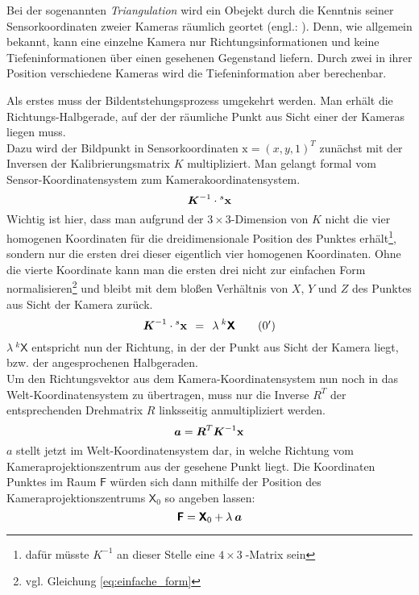 Bei der sogenannten \emph{Triangulation} wird ein Obejekt durch die Kenntnis seiner Sensorkoordinaten zweier Kameras räumlich geortet (engl.: ). Denn, wie allgemein bekannt, kann eine einzelne Kamera nur Richtungsinformationen und keine Tiefeninformationen über einen gesehenen Gegenstand liefern. Durch zwei in ihrer Position verschiedene Kameras wird die Tiefeninformation aber berechenbar.\kleinerabstand

Als erstes muss der Bildentstehungsprozess umgekehrt werden. Man erhält die Richtungs-Halbgerade, auf der der räumliche Punkt aus Sicht einer der Kameras liegen muss.\\
Dazu wird der Bildpunkt in Sensorkoordinaten $\mathrm{x}=(x,y,1)^T$ zunächst mit der Inversen der Kalibrierungsmatrix $K$ multipliziert. Man gelangt formal vom Sensor-Koordinatensystem zum Kamerakoordinatensystem.
\begin{equation}
	\boldsymbol{K}^{-1}\cdot {^s\boldsymbol{\mathrm{x}}}
\end{equation}
Wichtig ist hier, dass man aufgrund der $3{\times}3$-Dimension von $K$ nicht die vier homogenen Koordinaten für die dreidimensionale Position des Punktes erhält\footnote{dafür müsste $K^{-1}$ an dieser Stelle eine $4{\times}3\;$-Matrix sein}, sondern nur die ersten drei dieser eigentlich vier homogenen Koordinaten. Ohne die vierte Koordinate kann man die ersten drei nicht zur einfachen Form normalisieren\footnote{vgl. Gleichung \ref{eq:einfache_form}} und bleibt mit dem bloßen Verhältnis von $X$, $Y$ und $Z$ des Punktes aus Sicht der Kamera zurück.
\begin{equation*}
	\boldsymbol{K}^{-1}\cdot{^s\boldsymbol{\mathrm{x}}} {\:\:}={\:\:} \lambda\: {^k\boldsymbol{\mathsf{X}}} \tag{\theequation$^\prime$}
\end{equation*}
$\lambda\: {^k\mathsf{X}}$ entspricht nun der Richtung, in der der Punkt aus Sicht der Kamera liegt, bzw. der angesprochenen Halbgeraden.\\
Um den Richtungsvektor aus dem Kamera-Koordinatensystem nun noch in das Welt-Koordinatensystem zu übertragen, muss nur die Inverse $R^T$ der entsprechenden Drehmatrix $R$ linksseitig anmultipliziert werden.
\begin{equation}\label{eq:gleichung_richtungsvektor}
	\boldsymbol{a} = \boldsymbol{R}^T \boldsymbol{K}^{-1} \boldsymbol{\mathrm{x}}
\end{equation}
$a$ stellt jetzt im Welt-Koordinatensystem dar, in welche Richtung vom Kameraprojektionszentrum aus der gesehene Punkt liegt.
Die Koordinaten Punktes im Raum $\mathsf{F}$ würden sich dann mithilfe der Position des Kameraprojektionszentrums $\mathsf{X}_0$ so angeben lassen:
\begin{equation}\label{eq:gleichung_halbgerade}
	\boldsymbol{\mathsf{F}} = \boldsymbol{\mathsf{X}}_0 + \lambda\:\boldsymbol{a}
\end{equation}\kleinerabstand

